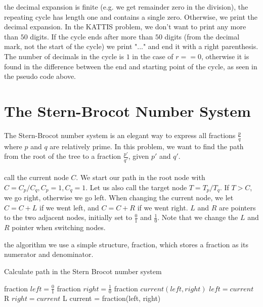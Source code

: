 \documentclass[11pt,a4paper,twoside]{article}
\begin{document}
       
 the decimal expansion is finite (e.g. we get remainder zero in the
division), the repeating cycle has length one and contains a single zero.
Otherwise, we print the decimal expansion. In the KATTIS problem, we don't want
to print any more than $50$ digits. If the cycle ends after more than $50$
digits (from the decimal mark, not the start of the cycle) we print "..." and
end it with a right parenthesis. The number of decimals in the cycle is $1$ in
the case of $r==0$, otherwise it is found in the difference between the end and
starting point of the cycle, as seen in the pseudo code above.


\section{The Stern-Brocot Number System}

The Stern-Brocot number system is an elegant way to express all fractions
$\frac{p}{q}$ where $p$ and $q$ are relatively prime. In this problem, we want
to find the path from the root of the tree to a fraction $\frac{p'}{q'}$, given
$p'$ and $q'$. 
\\\\
 call the current node $C$. We start our path in the root node
with $C = C_{p}/C_{q}, C_{p} = 1, C_{q} = 1$. Let us also call the target node
$T = T_{p}/T_{q}$. If $T > C$, we go right, otherwise we go left. When changing
the current node, we let $C = C + L$ if we went left, and $C = C + R$ if we
went right. $L$ and $R$ are pointers to the two adjacent nodes, initially set
to $\frac{0}{1}$ and $\frac{1}{0}$. Note that we change the $L$ and $R$ pointer
when switching nodes.


 the algorithm we use a simple structure, fraction, which stores a
fraction as its numerator and denominator.

\begin{algorithm}
    \caption{Calculate path in the Stern Brocot number system}
    \label{lst:sternbrocot}
    \begin{algorithmic}
        \STATE fraction $left = \frac{0}{1}$
        \STATE fraction $right = \frac{1}{0}$
        \STATE fraction $current(left, right)$ 
                \STATE $left = current$
                \PRINT R
            \ELSE
                \STATE $right = current$
                \PRINT L
            \ENDIF
            \STATE current = fraction(left, right) 
        \ENDWHILE
    \end{algorithmic}
\end{algorithm}
\end{document}
